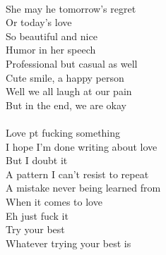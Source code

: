 \documentclass[12pt, b5paper, oneside]{book}
\begin{document}
\\She may he tomorrow's regret
\\Or today's love
\\So beautiful and nice
\\Humor in her speech
\\Professional but casual as well
\\Cute smile, a happy person
\\Well we all laugh at our pain
\\But in the end, we are okay
%
\\\\Love pt fucking something
\\I hope I'm done writing about love
\\But I doubt it
\\A pattern I can't resist to repeat
\\A mistake never being learned from
\\When it comes to love
\\Eh just fuck it
\\Try your best
\\Whatever trying your best is


\newpage
\end{document}
